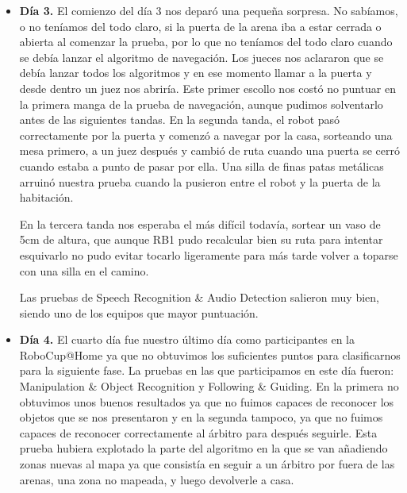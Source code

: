 \begin{itemize}
\item \textbf{Día 3.} El comienzo del día 3 nos deparó una pequeña sorpresa. No sabíamos, o no teníamos del todo claro, si la puerta de la arena iba a estar cerrada o abierta al comenzar la prueba, por lo que no teníamos del todo claro cuando se debía lanzar el algoritmo de navegación. Los jueces nos aclararon que se debía lanzar todos los algoritmos y en ese momento llamar a la puerta y desde dentro un juez nos abriría. Este primer escollo nos costó no puntuar en la primera manga de la prueba de navegación, aunque pudimos solventarlo antes de las siguientes tandas. En la segunda tanda, el robot pasó correctamente por la puerta y comenzó a navegar por la casa, sorteando una mesa primero, a un juez después y cambió de ruta cuando una puerta se cerró cuando estaba a punto de pasar por ella. Una silla de finas patas metálicas arruinó nuestra prueba cuando la pusieron entre el robot y la puerta de la habitación. 

En la tercera tanda nos esperaba el más difícil todavía, sortear un vaso de 5cm de altura, que aunque RB1 pudo recalcular bien su ruta para intentar esquivarlo no pudo evitar tocarlo ligeramente para más tarde volver a toparse con una silla en el camino. 

Las pruebas de Speech Recognition \& Audio Detection salieron muy bien, siendo uno de los equipos que mayor puntuación.

\item \textbf{Día 4.} El cuarto día fue nuestro último día como participantes en la RoboCup@Home ya que no obtuvimos los suficientes puntos para clasificarnos para la siguiente fase. La pruebas en las que participamos en este día fueron: Manipulation \& Object Recognition y Following \& Guiding. En la primera no obtuvimos unos buenos resultados ya que no fuimos capaces de reconocer los objetos que se nos presentaron y en la segunda tampoco, ya que no fuimos capaces de reconocer correctamente al árbitro para después seguirle. Esta prueba hubiera explotado la parte del algoritmo en la que se van añadiendo zonas nuevas al mapa ya que consistía en seguir a un árbitro por fuera de las arenas, una zona no mapeada, y luego devolverle a casa.
\end{itemize}


